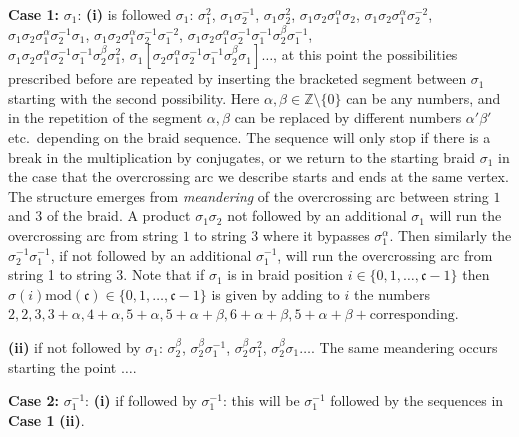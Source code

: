 \documentclass[11pt]{article}
\theoremstyle{definition}
\theoremstyle{remark}
\theoremstyle{remark}
\begin{document}
\vskip 0.1in

\noindent \textbf{Case 1:} $\sigma_1$: \textbf{(i)} is followed $\sigma_1$: $\sigma_1^2$, $\sigma_1\sigma_2^{-1}$, $\sigma_1\sigma_2^2$, $\sigma_1\sigma_2\sigma_1^{\alpha }\sigma_2$, $\sigma_1\sigma_2\sigma_1^{\alpha }\sigma_2^{-2}$, 
$\sigma_1\sigma_2\sigma_1^{\alpha }\sigma_2^{-1}\sigma_1$, 
$\sigma_1\sigma_2\sigma_1^{\alpha }\sigma_2^{-1}\sigma_1^{-2}$, $\sigma_1\sigma_2\sigma_1^{\alpha }\sigma_2^{-1}\sigma_1^{-1}\sigma_2^{\beta }\sigma_1^{-1}$, \\ $\sigma_1\sigma_2\sigma_1^{\alpha }\sigma_2^{-1}\sigma_1^{-1}\sigma_2^{\beta }\sigma_1^2$,  $\sigma_1[\sigma_2\sigma_1^{\alpha }\sigma_2^{-1}\sigma_1^{-1}\sigma_2^{\beta }\sigma_1]\ldots $, at this point the possibilities prescribed before are repeated 
by inserting the bracketed segment between $\sigma_1$ starting with the second possibility. Here $\alpha ,\beta \in \mathbb{Z}\setminus \{0\}$ can be any numbers, and in the repetition of the segment $\alpha ,\beta $ can be replaced 
by different numbers $\alpha '\beta '$ etc.\ depending on the braid sequence. The sequence will only stop if there is a 
break in the multiplication by conjugates, or we return to the starting braid $\sigma_1$ in the case that the overcrossing arc we describe starts and ends at the same vertex. The structure emerges from \textit{meandering} of the overcrossing arc between string $1$ and $3$ of the braid. A product $\sigma_1\sigma_2$ not followed by an additional $\sigma_1 $ will run the overcrossing arc from string $1$ to string 3 where it bypasses $\sigma_1^{\alpha }$. Then similarly the $\sigma_2^{-1}\sigma_1^{-1}$, if not followed by an additional $\sigma_1^{-1}$, will run the overcrossing arc from string 1 to string $3$. Note that if $\sigma_1$ is in braid position $i\in \{0,1,\ldots ,\mathfrak{c}-1\}$ then $\sigma (i)\textrm{mod} (\mathfrak{c})\in \{0,1,\ldots ,\mathfrak{c}-1\}$ is given by adding to $i$ the numbers
$2,2,3,3+\alpha,4+\alpha,5+\alpha,5+\alpha +\beta, 6+\alpha+\beta, 5+\alpha+\beta +\textrm{corresponding}$. 

\noindent \textbf{(ii)} if not followed by $\sigma_1$: $\sigma_2^{\beta }$, $\sigma_2^{\beta }\sigma_1^{-1}$, $\sigma_2^{\beta }\sigma_1^2$, 
$\sigma_2^{\beta }\sigma_1\ldots $. The same meandering occurs starting the point $\ldots $. 

\noindent \textbf{Case 2:} $\sigma_1^{-1}$: \textbf{(i)} if followed by $\sigma_1^{-1}$: this will be $\sigma_1^{-1}$ followed by the sequences in \textbf{Case 1} \textbf{(ii)}. 
\end{document}
